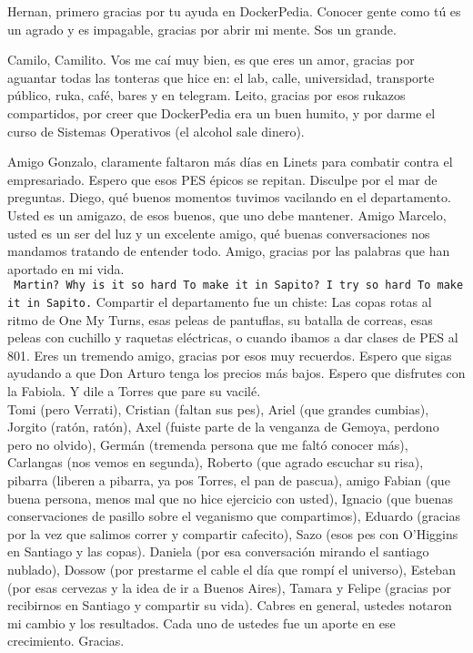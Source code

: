 Hernan, primero gracias por tu ayuda en DockerPedia. Conocer gente como tú es un agrado y es impagable, gracias por abrir mi mente. Sos un grande.

Camilo, Camilito. Vos me caí muy bien, es que eres un amor, gracias por aguantar todas las tonteras que hice en: el lab, calle, universidad, transporte público, ruka, café, bares y en telegram.
Leito, gracias por esos rukazos compartidos, por creer que DockerPedia era un buen humito, y por darme el curso de Sistemas Operativos (el alcohol sale dinero).

Amigo Gonzalo, claramente faltaron más días en Linets para combatir contra el empresariado. Espero que esos PES épicos se repitan. Disculpe por el mar de preguntas.
Diego, qué buenos momentos tuvimos vacilando en el departamento. Usted es un amigazo, de esos buenos, que uno debe mantener.
Amigo Marcelo, usted es un ser del luz y un excelente amigo, qué buenas conversaciones nos mandamos tratando de entender todo. Amigo, gracias por las palabras que han aportado en mi vida.\\
\texttt{
Martin?
Why is it so hard
To make it in Sapito?
I try so hard
To make it in Sapito.}
Compartir el departamento fue un chiste: Las copas rotas al ritmo de One My Turns, esas peleas de pantuflas, su batalla de correas, esas peleas con cuchillo y raquetas eléctricas, o cuando ibamos a dar clases de PES al 801. 
Eres un tremendo amigo, gracias por esos muy recuerdos. Espero que sigas ayudando a que Don Arturo tenga los precios más bajos. Espero que disfrutes con la Fabiola. Y dile a Torres que pare su vacilé.\\
Tomi (pero Verrati), Cristian (faltan sus pes), Ariel (que grandes cumbias), Jorgito (ratón, ratón), Axel (fuiste parte de la venganza de Gemoya, perdono pero no olvido), Germán (tremenda persona que me faltó conocer más), Carlangas (nos vemos en segunda), Roberto (que agrado escuchar su risa), pibarra (liberen a pibarra, ya pos Torres, el pan de pascua), amigo Fabian (que buena persona, menos mal que no hice ejercicio con usted), Ignacio (que buenas conservaciones de pasillo sobre el veganismo que compartimos), Eduardo (gracias por la vez que salimos correr y compartir cafecito), Sazo (esos pes con O'Higgins en Santiago y las copas). Daniela (por esa conversación mirando el santiago nublado), Dossow (por prestarme el cable el día que rompí el universo), Esteban (por esas cervezas y la idea de ir a Buenos Aires), Tamara y Felipe (gracias por recibirnos en Santiago y compartir su vida).
Cabres en general, ustedes notaron mi cambio y los resultados. Cada uno de ustedes fue un aporte en ese crecimiento. Gracias.\\
